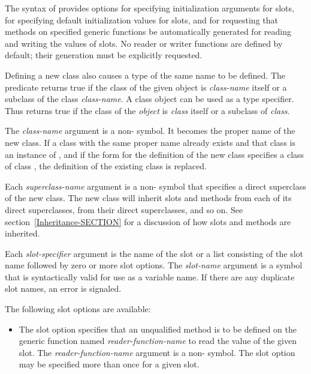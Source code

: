 \begin{defmac}
The syntax of  provides options for specifying
initialization arguments for slots, for specifying default
initialization values for slots, and for requesting that methods on
specified generic functions be automatically generated for reading and
writing the values of slots.  No reader or writer functions are
defined by default; their generation must be explicitly requested.

Defining a new class also causes a type of the same name to be
defined.  The predicate  returns
true if the class of the given object is \emph{class-name\/} itself or
a subclass of the class \emph{class-name}.  A class object can be used
as a type specifier.  Thus  returns true
if the class of the \emph{object\/} is \emph{class\/} itself or a
subclass of \emph{class}.





The \emph{class-name\/} argument is a non- symbol.  It becomes
the proper name of the new class.  If a class with the same proper
name already exists and that class is an instance of 
, and if the  form for the definition of the
new class specifies a class of class , the definition
of the existing class is replaced.

Each \emph{superclass-name\/} argument is a non- symbol that
specifies a direct superclass of the new class.  The new class will
inherit slots and methods from each of its direct superclasses, from
their direct superclasses, and so on.  See
section~\ref{Inheritance-SECTION}
for a discussion of how slots and methods are inherited.

Each \emph{slot-specifier\/} argument is the name of the slot or a list
consisting of the slot name followed by zero or more slot options.
The \emph{slot-name\/} argument is a symbol that is syntactically valid
for use as a variable name.  If there are any duplicate
slot names, an error is signaled.

The following slot options are available:

\begin{itemize}

\item 
The  slot option specifies that an unqualified method is
to be defined on the generic function named {\it
reader-function-name\/} to read the value of the given slot.
The \emph{reader-function-name\/} argument is a non-
symbol.  The  slot option may be specified more than once
for a given slot.


\end{itemize}
\end{defmac}
